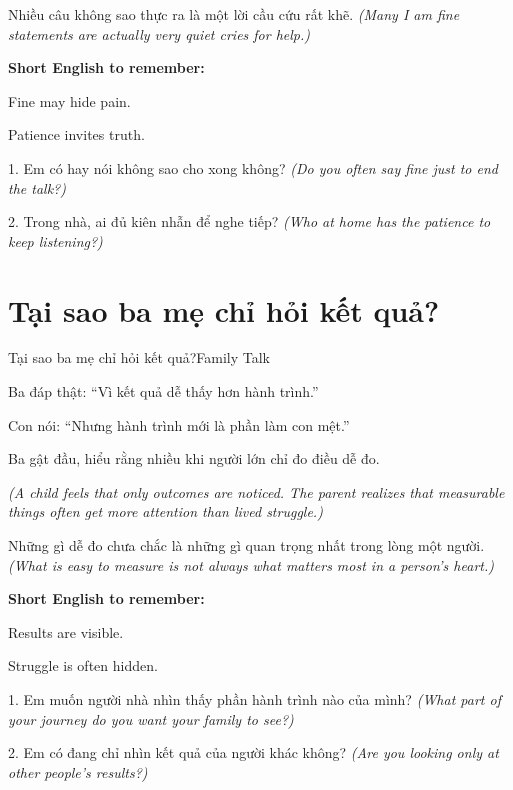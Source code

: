 \begin{baihoc}
Nhiều câu không sao thực ra là một lời cầu cứu rất khẽ.
\textit{(Many I am fine statements are actually very quiet cries for help.)}
\end{baihoc}

\begin{ghinhoanh}
\textbf{Short English to remember:}

Fine may hide pain.

Patience invites truth.
\end{ghinhoanh}

\begin{tuhocnhanh}
1. Em có hay nói không sao cho xong không? \textit{(Do you often say fine just to end the talk?)}

2. Trong nhà, ai đủ kiên nhẫn để nghe tiếp? \textit{(Who at home has the patience to keep listening?)}
\end{tuhocnhanh}
\ngancach

\section{Tại sao ba mẹ chỉ hỏi kết quả?}
\begin{truyen}{Tại sao ba mẹ chỉ hỏi kết quả?}{Family Talk}

Ba đáp thật: ``Vì kết quả dễ thấy hơn hành trình.''

Con nói: ``Nhưng hành trình mới là phần làm con mệt.''

Ba gật đầu, hiểu rằng nhiều khi người lớn chỉ đo điều dễ đo.

\textit{(A child feels that only outcomes are noticed. The parent realizes that measurable things often get more attention than lived struggle.)}
\end{truyen}

\begin{baihoc}
Những gì dễ đo chưa chắc là những gì quan trọng nhất trong lòng một người.
\textit{(What is easy to measure is not always what matters most in a person's heart.)}
\end{baihoc}

\begin{ghinhoanh}
\textbf{Short English to remember:}

Results are visible.

Struggle is often hidden.
\end{ghinhoanh}

\begin{tuhocnhanh}
1. Em muốn người nhà nhìn thấy phần hành trình nào của mình? \textit{(What part of your journey do you want your family to see?)}

2. Em có đang chỉ nhìn kết quả của người khác không? \textit{(Are you looking only at other people's results?)}
\end{tuhocnhanh}
\ngancach

